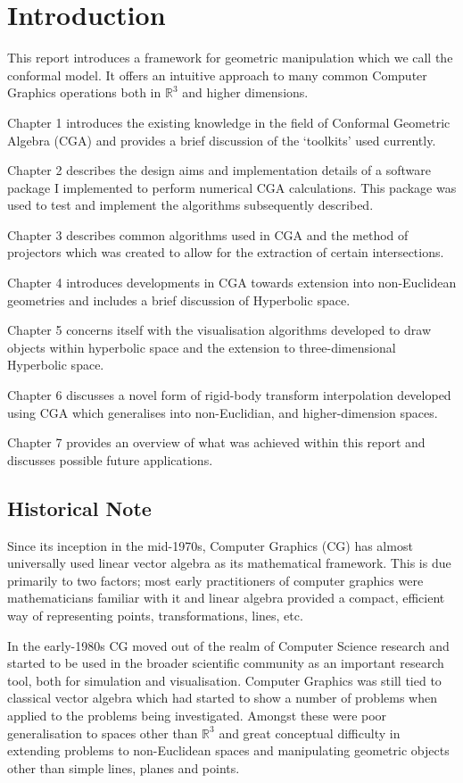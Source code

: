 
\chapter{Introduction}

This report introduces a framework for geometric manipulation
which we call the conformal model. It offers an intuitive approach to many
common Computer Graphics operations both in $\mathbb{R}^3$ and
higher dimensions.

Chapter 1 introduces the existing knowledge in the field of
Conformal Geometric Algebra (CGA) and provides a brief discussion of
the `toolkits' used currently.

Chapter 2 describes the design aims and implementation details of a
software package I implemented to perform numerical CGA calculations.
This package was used to test and implement the algorithms subsequently
described.

Chapter 3 describes common algorithms used in CGA and the method of
projectors which was created to allow for the extraction of certain 
intersections.

Chapter 4 introduces developments in CGA towards extension into non-Euclidean
geometries and includes a brief discussion of Hyperbolic space.

Chapter 5 concerns itself with the visualisation algorithms developed to
draw objects within hyperbolic space and the extension to three-dimensional
Hyperbolic space.

Chapter 6 discusses a novel form of rigid-body transform interpolation
developed using CGA which generalises into non-Euclidian, and higher-dimension
spaces.

Chapter 7 provides an overview of what was achieved within this report and
discusses possible future applications.

\section{Historical Note}
Since its inception in the mid-1970s, Computer Graphics (CG) has almost
universally used linear vector algebra as its mathematical framework.
This is due primarily to two factors; most early practitioners of
computer graphics were mathematicians familiar with it and 
linear algebra provided a compact, efficient way of representing points, 
transformations, lines, etc.

In the early-1980s CG moved out of the realm of Computer
Science research and started to be used in the broader scientific 
community as an important research tool, both for simulation and visualisation.
Computer Graphics was still tied to classical vector algebra which
had started to show a number of problems when applied to the problems
being investigated. Amongst these were poor generalisation to
spaces other than $\mathbb{R}^3$ and great conceptual difficulty 
in extending problems to non-Euclidean spaces and
manipulating geometric objects other than simple lines, planes and points.

